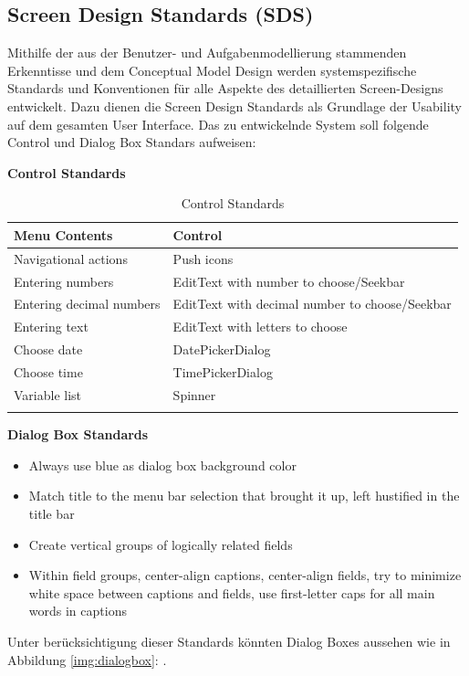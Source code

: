 \subsection{Screen Design Standards (SDS)}
Mithilfe der aus der Benutzer- und Aufgabenmodellierung stammenden Erkenntisse und dem Conceptual Model Design werden systemspezifische Standards und Konventionen für alle Aspekte des detaillierten Screen-Designs entwickelt. Dazu dienen die Screen Design Standards als Grundlage der Usability auf dem gesamten User Interface. Das zu entwickelnde System soll folgende Control und Dialog Box Standars aufweisen:\\
\centerline{\textbf{Control Standards}}
\begin{center}
	\begin{longtable}[H]{p{8cm}p{6cm}}
		\textbf{Menu Contents} & \textbf{Control}\\
		\toprule
		Navigational actions & Push icons\\
		Entering numbers & EditText with number to choose/Seekbar\\
		Entering decimal numbers &  EditText with decimal number to choose/Seekbar\\
		Entering text & EditText with letters to choose\\
		Choose date & DatePickerDialog\\
		Choose time & TimePickerDialog\\
		Variable list & Spinner\\
		\bottomrule
		\captionsetup{justification=centering}
		\caption{Control Standards}
		\label{tab:controlstandars}
	\end{longtable}
\end{center}
\centerline{\textbf{Dialog Box Standards}}
\begin{itemize}
	\item Always use blue as dialog box background color 
	\item Match title to the menu bar selection that brought it up, left hustified in the title bar
	\item Create vertical groups of logically related fields
	\item Within field groups, center-align captions, center-align fields, try to minimize white space between captions and fields, use first-letter caps for all main words in captions
\end{itemize}
Unter berücksichtigung dieser Standards könnten Dialog Boxes aussehen wie in Abbildung \ref{img:dialogbox}: .
